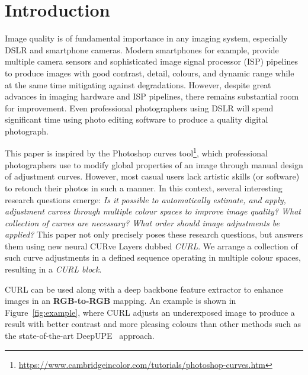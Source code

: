 \documentclass[a4paper,conference]{IEEEtran}
\begin{document}
\IEEEpeerreviewmaketitle

\section{Introduction}

Image quality is of fundamental importance in any imaging system, especially DSLR and smartphone cameras.  Modern smartphones for example, provide multiple camera sensors and sophisticated image signal processor (ISP) pipelines to produce images with good contrast, detail, colours, and dynamic range while at the same time mitigating against degradations.  However, despite great advances in imaging hardware and ISP pipelines, there remains substantial room for improvement. Even professional photographers using DSLR will spend significant time using photo editing software to produce a quality digital photograph.

This paper is inspired by the Photoshop curves tool\footnote{\url{https://www.cambridgeincolor.com/tutorials/photoshop-curves.htm}}, which professional photographers  use to modify global properties of an image through manual design of adjustment curves. However, most casual users lack artistic skills (or software) to retouch their photos in such a manner. In this context, several interesting research questions emerge: \emph{Is it possible to automatically estimate, and apply, adjustment curves through multiple colour spaces to improve image quality? What collection of curves are necessary? What order should image adjustments be applied?} This paper not only precisely poses these research questions, but answers them using new neural CURve Layers dubbed \emph{CURL}.  We arrange a collection of such curve adjustments in a defined sequence operating in multiple colour spaces, resulting in a \emph{CURL block}.

CURL can be used along with a deep backbone feature extractor to enhance images in an \textbf{RGB-to-RGB} mapping.  An example is shown in Figure~\ref{fig:example}, where CURL adjusts an underexposed image to produce a result with better contrast and more pleasing colours than other methods such as the state-of-the-art DeepUPE~\cite{wang19} approach.
\end{document}
